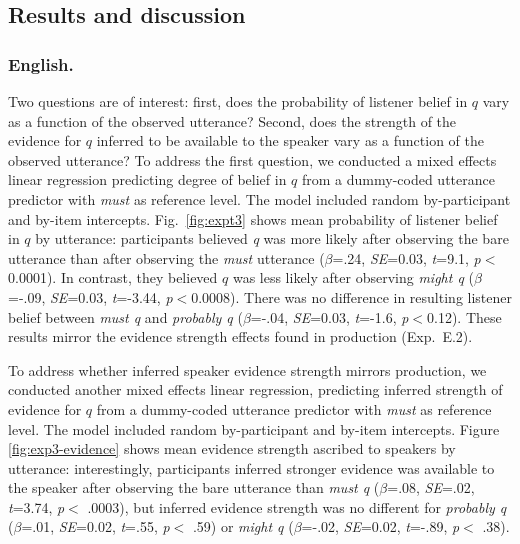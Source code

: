\documentclass[11pt]{article}
\newcommand{\figref}[1]{Figure \ref{#1}}
\begin{document}
\subsection{Results and discussion}

\subsubsection{English.} Two questions are of interest: first, does the probability of listener belief in $q$ vary as a function of the observed utterance? Second, does the strength of the evidence for $q$ inferred to be available to the speaker vary as a function of the observed utterance? To address the first question, we conducted a mixed effects linear regression predicting degree of belief in $q$ from a dummy-coded utterance predictor with \emph{must} as reference level. The model included random by-participant and by-item intercepts. Fig.~\ref{fig:expt3} shows mean probability of listener belief in $q$ by utterance: participants believed \emph{q} was more likely after observing the bare utterance than after observing the \emph{must} utterance   ($\beta$=.24, \emph{SE}=0.03, \emph{t}=9.1, \emph{p}$<$0.0001). In contrast, they believed $q$ was less likely after observing \emph{might q} ($\beta$=-.09, \emph{SE}=0.03, \emph{t}=-3.44, \emph{p}$<$0.0008). There was no difference in resulting listener belief between \emph{must q} and \emph{probably q} ($\beta$=-.04, \emph{SE}=0.03, \emph{t}=-1.6, \emph{p}$<$0.12). These results mirror the evidence strength effects found in production (Exp.~E.2). 

To address whether inferred speaker evidence strength mirrors production, we conducted another mixed effects linear regression, predicting inferred strength of evidence for $q$ from a dummy-coded utterance predictor with \emph{must} as reference level. The model included random by-participant and by-item intercepts.  \figref{fig:exp3-evidence} shows mean evidence strength ascribed to speakers by utterance:  interestingly, participants inferred stronger evidence was available to the speaker after observing the bare utterance than \emph{must q} ($\beta$=.08, \emph{SE}=.02, \emph{t}=3.74, \emph{p}$<$ .0003), but inferred evidence strength was no different for \emph{probably q} ($\beta$=.01, \emph{SE}=0.02, \emph{t}=.55, \emph{p}$<$ .59) or \emph{might q} ($\beta$=-.02, \emph{SE}=0.02, \emph{t}=-.89, \emph{p}$<$ .38).
\end{document}
